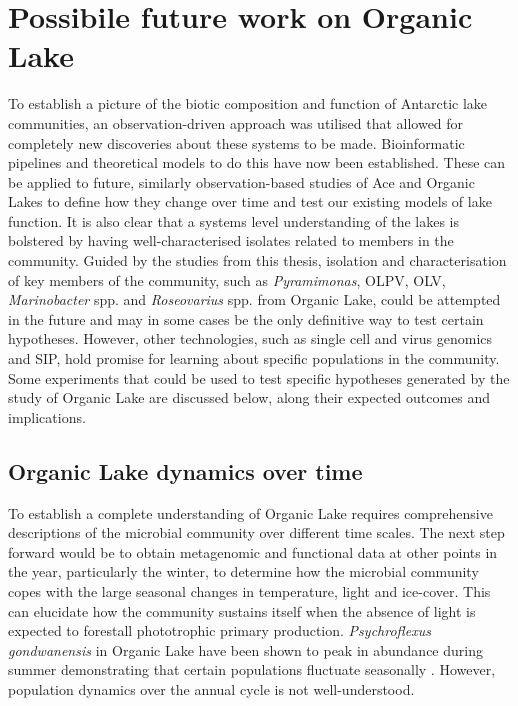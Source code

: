 \section{Possibile future work on Organic Lake}
To establish a picture of the biotic composition and function of Antarctic lake communities, an observation-driven approach was utilised that allowed for completely new discoveries about these systems to be made.
Bioinformatic pipelines and theoretical models to do this have now been established.
These can be applied to future, similarly observation-based studies of Ace and Organic Lakes to define how they change over time and test our existing models of lake function.
It is also clear that a systems level understanding of the lakes is bolstered by having well-characterised isolates related to members in the community.
Guided by the studies from this thesis, isolation and characterisation of key members of the community, such as \emph{Pyramimonas}, \ac{OLPV}, \ac{OLV}, \emph{Marinobacter} spp. and \emph{Roseovarius} spp. from Organic Lake, could be attempted in the future and may in some cases be the only definitive way to test certain hypotheses.
However, other technologies, such as single cell and virus genomics and \ac{SIP}, hold promise for learning about specific populations in the community.
Some experiments that could be used to test specific hypotheses generated by the study of Organic Lake are discussed below, along their expected outcomes and implications.

\subsection{Organic Lake dynamics over time}
To establish a complete understanding of Organic Lake requires comprehensive descriptions of the microbial community over different time scales.
The next step forward would be to obtain metagenomic and functional data at other points in the year, particularly the winter, to determine how the microbial community copes with the large seasonal changes in temperature, light and ice-cover.
This can elucidate how the community sustains itself when the absence of light is expected to forestall phototrophic primary production.
\emph{Psychroflexus gondwanensis} in Organic Lake have been shown to peak in abundance during summer demonstrating that certain populations fluctuate seasonally \cite{James1994}.
However, population dynamics over the annual cycle is not well-understood.

